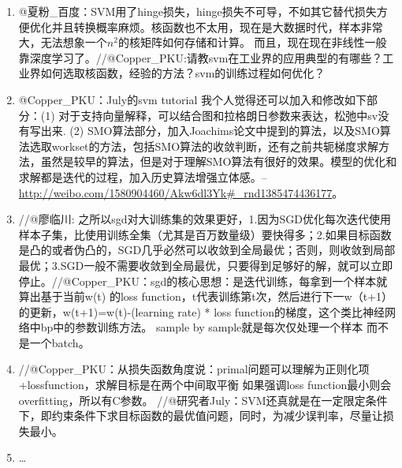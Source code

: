 \documentclass[a4paper,12pt]{article}
\begin{document}
\begin{enumerate}[1.~]
    \item @夏粉\_百度：SVM用了hinge损失，hinge损失不可导，不如其它替代损失方便优化并且转换概率麻烦。核函数也不太用，现在是大数据时代，样本非常大，无法想象一个$n^2$的核矩阵如何存储和计算。 而且，现在现在非线性一般靠深度学习了。//@Copper\_PKU:请教svm在工业界的应用典型的有哪些？工业界如何选取核函数，经验的方法？svm的训练过程如何优化？
    \item @Copper\_PKU：July的svm tutorial 我个人觉得还可以加入和修改如下部分：(1) 对于支持向量解释，可以结合图和拉格朗日参数来表达，松弛中sv没有写出来. (2) SMO算法部分，加入Joachims论文中提到的算法，以及SMO算法选取workset的方法，包括SMO算法的收敛判断，还有之前共轭梯度求解方法，虽然是较早的算法，但是对于理解SMO算法有很好的效果。模型的优化和求解都是迭代的过程，加入历史算法增强立体感。--  \url{http://weibo.com/1580904460/Akw6dl3Yk#\_rnd1385474436177}。
    \item //@廖临川: 之所以sgd对大训练集的效果更好，1.因为SGD优化每次迭代使用样本子集，比使用训练全集（尤其是百万数量级）要快得多；2.如果目标函数是凸的或者伪凸的，SGD几乎必然可以收敛到全局最优；否则，则收敛到局部最优；3.SGD一般不需要收敛到全局最优，只要得到足够好的解，就可以立即停止。//@Copper\_PKU：sgd的核心思想：是迭代训练，每拿到一个样本就算出基于当前w(t) 的loss function，t代表训练第t次，然后进行下一w（t+1）的更新，w(t+1)=w(t)-(learning rate) * loss function的梯度，这个类比神经网络中bp中的参数训练方法。 sample by sample就是每次仅处理一个样本 而不是一个batch。
    \item //@Copper\_PKU：从损失函数角度说：primal问题可以理解为正则化项+lossfunction，求解目标是在两个中间取平衡 如果强调loss function最小则会overfitting，所以有C参数。 //@研究者July：SVM还真就是在一定限定条件下，即约束条件下求目标函数的最优值问题，同时，为减少误判率，尽量让损失最小。
    \item \ldots
\end{enumerate}
\end{document}
